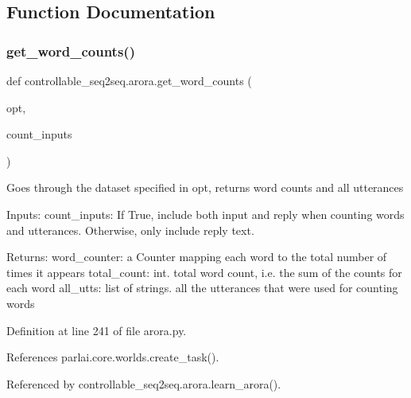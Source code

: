 \subsection{Function Documentation}
\mbox{\label{namespacecontrollable__seq2seq_1_1arora_aa75b304fb4087b1a9134d05f4bb6b3a7}} 
\subsubsection{\texorpdfstring{get\+\_\+word\+\_\+counts()}{get\_word\_counts()}}
{\footnotesize\ttfamily def controllable\+\_\+seq2seq.\+arora.\+get\+\_\+word\+\_\+counts (\begin{DoxyParamCaption}\item[{}]{opt,  }\item[{}]{count\+\_\+inputs }\end{DoxyParamCaption})}

\begin{DoxyVerb}Goes through the dataset specified in opt, returns word counts and all utterances

Inputs:
  count_inputs: If True, include both input and reply when counting words and
    utterances. Otherwise, only include reply text.

Returns:
  word_counter: a Counter mapping each word to the total number of times it appears
  total_count: int. total word count, i.e. the sum of the counts for each word
  all_utts: list of strings. all the utterances that were used for counting words
\end{DoxyVerb}
 

Definition at line 241 of file arora.\+py.



References parlai.\+core.\+worlds.\+create\+\_\+task().



Referenced by controllable\+\_\+seq2seq.\+arora.\+learn\+\_\+arora().

